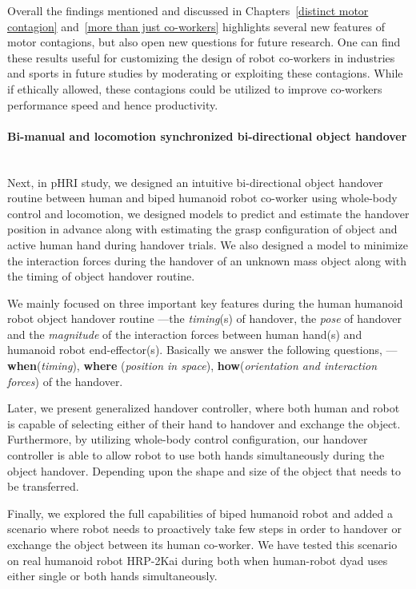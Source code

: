 Overall the findings mentioned and discussed in Chapters~\ref{distinct motor contagion} and~\ref{more than just co-workers} highlights several new features of motor contagions, but also open new questions for future research. One can find these results useful for customizing the design of robot co-workers in industries and sports in future studies by moderating or exploiting these contagions. While if ethically allowed, these contagions could be utilized to improve co-workers performance speed and hence productivity.


\paragraph*{\LARGE {Bi-manual and locomotion synchronized bi-directional object handover \\}\\}


Next, in pHRI study, we designed an intuitive bi-directional object handover routine between human and biped humanoid robot co-worker using whole-body control and locomotion, we designed models to predict and estimate the handover position in advance along with estimating the grasp configuration of object and active human hand during handover trials. We also designed a model to minimize the interaction forces during the handover of an unknown mass object along with the timing of object handover routine.

We mainly focused on three important key features during the human humanoid robot object handover routine ---the \textit{timing}(s) of handover, the \textit{pose} of handover and the \textit{magnitude} of the interaction forces between human hand(s) and humanoid robot end-effector(s). Basically we answer the following questions, ---\textbf{when}(\textit{timing}), \textbf{where} (\textit{position in space}), \textbf{how}(\textit{orientation and interaction forces}) of the handover.

Later, we present generalized handover controller, where both human and robot is capable of selecting either of their hand to handover and exchange the object. Furthermore, by utilizing whole-body control configuration, our handover controller is able to allow robot to use both hands simultaneously during the object handover. Depending upon the shape and size of the object that needs to be transferred.

Finally, we explored the full capabilities of biped humanoid robot and added a scenario where robot needs to proactively take few steps in order to handover or exchange the object between its human co-worker. We have tested this scenario on real humanoid robot HRP-2Kai during both when human-robot dyad uses either single or both hands simultaneously.





